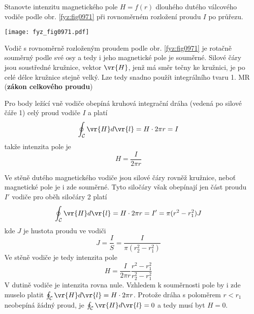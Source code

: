 \begin{mdframed}[style=mdexam]
  \begin{example}
    Stanovte intenzitu magnetického pole $H=f(r)$ dlouhého dutého válcového vodiče podle obr.
    \ref{fyz:fig0971} při rovnoměrném rozložení proudu $I$ po průřezu. 
    
    {\centering
      \captionsetup{type=figure}
      \texttt{[image: fyz\_fig0971.pdf]}
      \label{fyz:fig0971}
    \par}
    
    Vodič s rovnoměrně rozloženým proudem podle obr. \ref{fyz:fig0971} je rotačně souměrný podle své
    osy a tedy i jeho magnetické pole je souměrné. Silové čáry jsou soustředné kružnice, vektor
    $\vr{H}$, jenž má směr tečny ke kružnici, je po celé délce kružnice stejně velký. Lze tedy
    snadno použít integrálního tvaru 1. MR (\textbf{zákon celkového proudu})
    
    Pro body ležící vně vodiče obepíná kruhová integrační dráha (vedená po silové čáře 1) celý
    proud vodiče $I$ a platí
    \begin{equation}\label{TEMP:eq_1MR_duty_valec}
      \oint_{\mathcal{C}}\vr{H}d\vr{l} = H\cdot 2\pi r = I
    \end{equation}
    takže intenzita pole je
    \begin{equation}\label{TEMP:eq_H_duty_valec}
      H = \frac{I}{2\pi r}
    \end{equation}
    
    Ve stěně dutého magnetického vodiče jsou silové čáry rovněž kružnice, neboť magnetické pole
    je i zde souměrné. Tyto siločáry však obepínají jen část proudu $I'$ vodiče pro oběh siločáry
    2 platí
    \begin{equation}\label{TEMP:eq_1MR_uvnitr_valce}
      \oint_{\mathcal{C}}\vr{H}d\vr{l} = H\cdot 2\pi r = I' = \pi(r^2-r_1^2)J
    \end{equation}
    kde $J$ je hustota proudu ve vodiči
    \begin{equation}\label{TEMP:eq_J_duty_valec}
      J = \frac{I}{S}= \frac{I}{\pi(r_2^2-r_1^2)}
    \end{equation}
    Ve stěně vodiče je tedy intenzita pole
    \begin{equation}\label{TEMP:eq_H_uvnitr_valce}
      H = \frac{I}{2\pi r}\frac{r^2-r_1^2}{r_2^2-r_1^2}
    \end{equation}
    V dutině vodiče je intenzita rovna nule. Vzhledem k souměrnosti pole by i zde muselo platit
    $\oint_{\mathcal{C}}\vr{H}d\vr{l} = H\cdot 2\pi r$. Protože dráha s poloměrem $r<r_1$ neobepíná
    žádný proud, je $\oint_{\mathcal{C}}\vr{H}d\vr{l} = 0$ a tedy musí byt $H = 0$.
  \end{example}    
\end{mdframed}